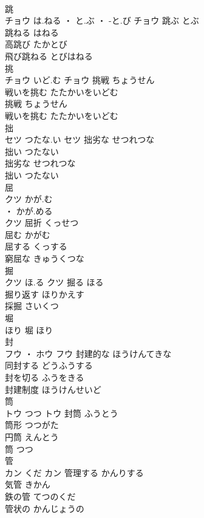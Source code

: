 \documentclass[8pt]{extreport}
\begin{document}
\begin{CJK}{UTF8}{min}
\\	跳	
\\	チョウ	は.ねる ・ と.ぶ ・ -と.び	チョウ	跳ぶ	とぶ	
\\	跳ねる	はねる	
\\	高跳び	たかとび	
\\	飛び跳ねる	とびはねる	
\\	挑	
\\	チョウ	いど.む	チョウ	挑戦	ちょうせん	
\\	戦いを挑む	たたかいをいどむ	
\\	挑戦	ちょうせん	
\\	戦いを挑む	たたかいをいどむ	
\\	拙	
\\	セツ	つたな.い	セツ	拙劣な	せつれつな	
\\	拙い	つたない	
\\	拙劣な	せつれつな	
\\	拙い	つたない	
\\	屈	
\\	クツ	かが.む
\\	・ かが.める
\\	クツ	屈折	くっせつ	
\\	屈む	かがむ	
\\	屈する	くっする	
\\	窮屈な	きゅうくつな	
\\	掘	
\\	クツ	ほ.る	クツ	掘る	ほる	
\\	掘り返す	ほりかえす	
\\	採掘	さいくつ	
\\	堀	
\\	ほり														堀	ほり	
\\	封	
\\	フウ ・ ホウ		フウ	封建的な	ほうけんてきな	
\\	同封する	どうふうする	
\\	封を切る	ふうをきる	
\\	封建制度	ほうけんせいど	
\\	筒	
\\	トウ	つつ	トウ	封筒	ふうとう	
\\	筒形	つつがた	
\\	円筒	えんとう	
\\	筒	つつ	
\\	管	
\\	カン	くだ	カン	管理する	かんりする	
\\	気管	きかん	
\\	鉄の管	てつのくだ	
\\	管状の	かんじょうの	

\end{CJK}
\end{document}
